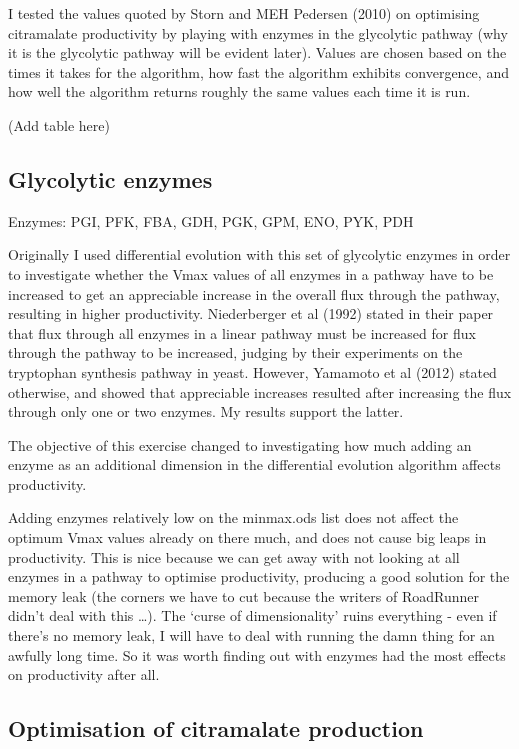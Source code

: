 \documentclass[parskip=full]{scrreprt}
\begin{document}
I tested the values quoted by Storn and MEH Pedersen (2010) on optimising citramalate productivity by playing with enzymes in the glycolytic pathway (why it is the glycolytic pathway will be evident later). Values are chosen based on the times it takes for the algorithm, how fast the algorithm exhibits convergence, and how well the algorithm returns roughly the same values each time it is run.

(Add table here)

\subsection{Glycolytic enzymes}
\label{ssec:glycolytic}

Enzymes: PGI, PFK, FBA, GDH, PGK, GPM, ENO, PYK, PDH

Originally I used differential evolution with this set of glycolytic enzymes in order to investigate whether the Vmax values of all enzymes in a pathway have to be increased to get an appreciable increase in the overall flux through the pathway, resulting in higher productivity. Niederberger et al (1992) stated in their paper that flux through all enzymes in a linear pathway must be increased for flux through the pathway to be increased, judging by their experiments on the tryptophan synthesis pathway in yeast. However, Yamamoto et al (2012) stated otherwise, and showed that appreciable increases resulted after increasing the flux through only one or two enzymes. My results support the latter.

The objective of this exercise changed to investigating how much adding an enzyme as an additional dimension in the differential evolution algorithm affects productivity.

Adding enzymes relatively low on the minmax.ods list does not affect the optimum Vmax values already on there much, and does not cause big leaps in productivity. This is nice because we can get away with not looking at all enzymes in a pathway to optimise productivity, producing a good solution for the memory leak (the corners we have to cut because the writers of RoadRunner didn't deal with this \ldots). The `curse of dimensionality' ruins everything - even if there's no memory leak, I will have to deal with running the damn thing for an awfully long time. So it was worth finding out with enzymes had the most effects on productivity after all.

\subsection{Optimisation of citramalate production}
\label{ssec:optcitra}
\end{document}
